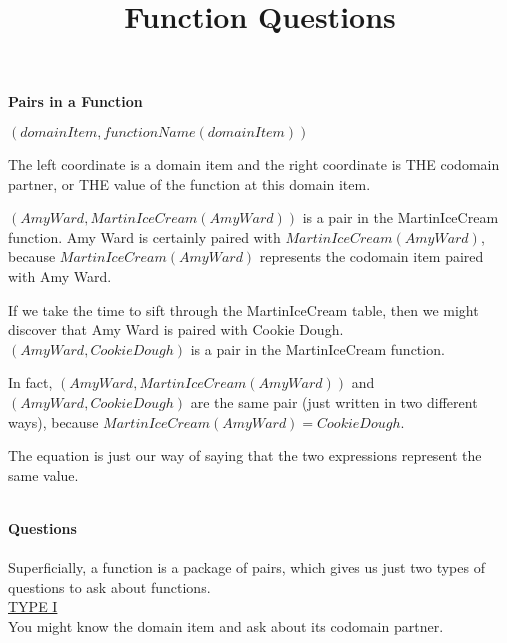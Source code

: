 \documentclass{ximera}
\title{Function Questions}
\begin{document}
\begin{abstract}
\end{abstract}

\maketitle





\textbf{Pairs in a Function} \\


\begin{center}
\textbf{$(domainItem, functionName(domainItem))$}
\end{center}

The left coordinate is a domain item and the right coordinate is THE codomain partner, or THE value of the function at this domain item.
\quad \\

\begin{example}
$(Amy Ward, MartinIceCream(Amy Ward))$ is a pair in the MartinIceCream function. Amy Ward is certainly paired with $MartinIceCream(Amy Ward)$, because $MartinIceCream(Amy Ward)$ represents the codomain item paired with Amy Ward.

If we take the time to sift through the MartinIceCream table, then we might discover that Amy Ward is paired with Cookie Dough.  $(Amy Ward, Cookie Dough)$ is a pair in the MartinIceCream function. 

In fact, $(Amy Ward, MartinIceCream(Amy Ward))$ and $(Amy Ward, Cookie Dough)$ are the same pair (just written in two different ways), because $MartinIceCream(Amy Ward) = Cookie Dough$.

The equation is just our way of saying that the two expressions represent the same value.        

\end{example}


\quad \\



\textbf{Questions} \\
\quad \\

Superficially, a function is a package of pairs, which gives us just two types of questions to ask about functions.
\quad \\

\underline{TYPE I} \\
You might know the domain item and ask about its codomain partner. 
\end{document}
